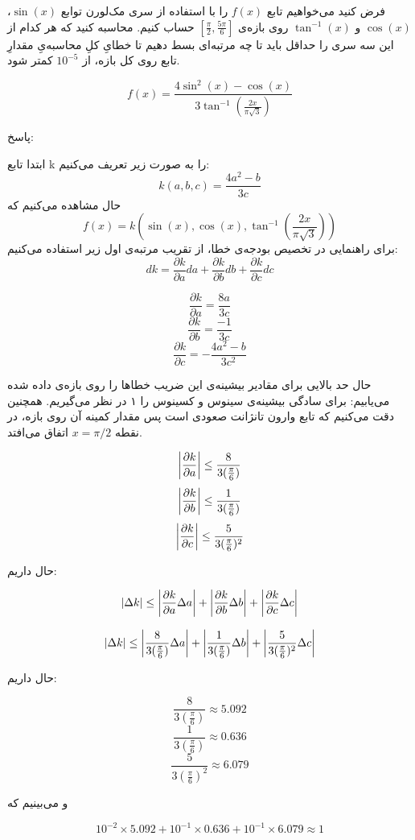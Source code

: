 فرض کنید می‌خواهیم تابع 
$f(x)$
را با استفاده از سری مک‌لورن توابع $\sin(x)$، $\cos(x)$ و $\tan^{-1}(x)$ روی بازه‌ی $[\frac{\pi}{2}, \frac{5\pi}{6}]$ حساب کنیم.
محاسبه کنید که هر کدام از این سه سری را حداقل باید تا چه مرتبه‌ای بسط دهیم تا خطایِ کلِ محاسبه‌یِ مقدارِ تابع روی کل بازه، از $10^{-5}$ کمتر شود.

$$f(x) = \frac{ 4\sin^2(x) - \cos(x) }{3\tan^{-1}(\frac{2x}{\pi \sqrt{3}})}$$

پاسخ:

ابتدا تابع k را به صورت زیر تعریف می‌کنیم:
$$k(a,b,c) = \frac{4a^2 - b}{3c}$$
حال مشاهده می‌کنیم که 
$$f(x) = k(\sin(x), \cos(x), \tan^{-1}(\frac{2x}{\pi \sqrt{3}}))$$
برای راهنمایی در تخصیص بودجه‌ی خطا، از تقریب مرتبه‌ی اول زیر استفاده می‌کنیم:
$$d k = \frac{\partial k}{\partial a} d a + \frac{\partial k}{\partial b} d b + \frac{\partial k}{\partial c} d c$$

$$\frac{\partial k}{\partial a} = \frac{8a}{3c}$$
$$\frac{\partial k}{\partial b} = \frac{-1}{3c}$$
$$\frac{\partial k}{\partial c} = -\frac{4a^2-b}{3c^2}$$

حال حد بالایی برای مقادیر بیشینه‌ی این ضریب خطاها را روی بازه‌ی داده شده می‌یابیم:
برای سادگی بیشینه‌ی سینوس و کسینوس را ۱ در نظر می‌گیریم. همچنین دقت می‌کنیم که تابع وارون تانژانت صعودی است پس مقدار کمینه آن روی بازه، در نقطه $x=\pi/2$ اتفاق می‌افتد.

$$\abs{\frac{\partial k}{\partial a}} \leq \frac{8}{3 (\frac{\pi}{6})}$$
$$\abs{\frac{\partial k}{\partial b}} \leq \frac{1}{3 (\frac{\pi}{6})}$$
$$\abs{\frac{\partial k}{\partial c}} \leq \frac{5}{3 (\frac{\pi}{6})^2}$$

حال داریم:

$$|\Delta k| \leq \abs{\frac{\partial k}{\partial a} \Delta a} + \abs{\frac{\partial k}{\partial b} \Delta b} + \abs{\frac{\partial k}{\partial c} \Delta c}$$

$$|\Delta k| \leq \abs{ \frac{8}{3 (\frac{\pi}{6})} \Delta a} + \abs{\frac{1}{3 (\frac{\pi}{6})} \Delta b} + \abs{\frac{5}{3 (\frac{\pi}{6})^2} \Delta c}$$

حال داریم:

$$\frac{8}{3 (\frac{\pi}{6})} \approx 5.092$$
$$\frac{1}{3 (\frac{\pi}{6})} \approx 0.636$$
$$\frac{5}{3 (\frac{\pi}{6})^2} \approx 6.079$$

و می‌بینیم که 

$$10^{-2} \times 5.092 + 10^{-1} \times 0.636 + 10^{-1} \times 6.079 \approx 1$$

